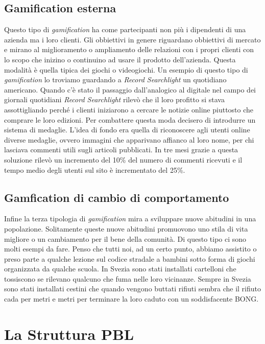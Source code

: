 \subsection{Gamification esterna}
Questo tipo di \textit{gamification} ha come partecipanti non più i dipendenti di una azienda ma i loro clienti. Gli obbiettivi in genere riguardano obbiettivi di mercato e mirano al miglioramento o ampliamento delle relazioni con i propri clienti con lo scopo che inizino o continuino ad usare il prodotto dell'azienda. Questa modalità è quella tipica dei giochi o videogiochi. Un esempio di questo tipo di \textit{gamification} lo troviamo guardando a \textit{Record Searchlight} un quotidiano americano. Quando c'è stato il passaggio dall'analogico al digitale nel campo dei giornali quotidiani \textit{Record Searchlight} rilevò che il loro profitto si stava assottigliando perché i clienti iniziarono a cercare le notizie online piuttosto che comprare le loro edizioni. Per combattere questa moda decisero di introdurre un sistema di medaglie. L'idea di fondo era quella di riconoscere agli utenti online diverse medaglie, ovvero immagini che apparivano affianco al loro nome, per chi lasciava commenti utili sugli articoli pubblicati. In tre mesi grazie a questa soluzione rilevò un incremento del 10\% del numero di commenti ricevuti e il tempo medio degli utenti sul sito è incrementato del 25\%.
\subsection{Gamfication di cambio di comportamento}
Infine la terza tipologia di \textit{gamification} mira a sviluppare nuove abitudini in una popolazione. Solitamente queste nuove abitudini promuovono uno stila di vita migliore o un cambiamento per il bene della comunità. Di questo tipo ci sono molti esempi da fare. Penso che tutti noi, ad un certo punto, abbiamo assistito o preso parte a qualche lezione sul codice stradale a bambini sotto forma di giochi organizzata da qualche scuola. In Svezia sono stati installati cartelloni che tossiscono se rilevano qualcuno che fuma nelle loro vicinanze. Sempre in Svezia sono stati installati cestini che quando vengono buttati rifiuti sembra che il rifiuto cada per metri e metri per terminare la loro caduto con un soddisfacente BONG.
\section{La Struttura PBL}

